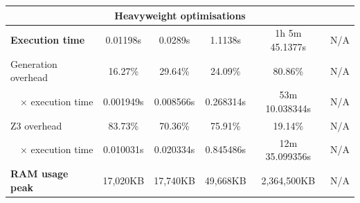 \documentclass[english,runningheads]{llncs}
\begin{document}
\begin{table}[b]
{\begin{tabular}{l||lllll}
\multicolumn{6}{c}{\textbf{Heavyweight optimisations}} \\ \hline \hline
\textbf{Execution time}                & \multicolumn{1}{c|}{0.01198s}   & \multicolumn{1}{c|}{0.0289s}   & \multicolumn{1}{c|}{1.1138s}   & \multicolumn{1}{c|}{1h 5m 45.1377s} & \multicolumn{1}{c}{\color[HTML]{888888} N/A} \\ \hline
Generation overhead                    & \multicolumn{1}{c|}{16.27\%}    & \multicolumn{1}{c|}{29.64\%}   & \multicolumn{1}{c|}{24.09\%}   & \multicolumn{1}{c|}{80.86\%}        & \multicolumn{1}{c}{\color[HTML]{888888} N/A} \\ \hline
\multicolumn{1}{r||}{× execution time} & \multicolumn{1}{c|}{0.001949s}  & \multicolumn{1}{c|}{0.008566s} & \multicolumn{1}{c|}{0.268314s} & \multicolumn{1}{c|}{53m 10.038344s} & \multicolumn{1}{c}{\color[HTML]{888888} N/A} \\ \hline
Z3 overhead                            & \multicolumn{1}{c|}{83.73\%}    & \multicolumn{1}{c|}{70.36\%}   & \multicolumn{1}{c|}{75.91\%}   & \multicolumn{1}{c|}{19.14\%}        & \multicolumn{1}{c}{\color[HTML]{888888} N/A} \\ \hline
\multicolumn{1}{r||}{× execution time} & \multicolumn{1}{c|}{0.010031s}  & \multicolumn{1}{c|}{0.020334s} & \multicolumn{1}{c|}{0.845486s} & \multicolumn{1}{c|}{12m 35.099356s} & \multicolumn{1}{c}{\color[HTML]{888888} N/A} \\ \hline
\textbf{RAM usage peak}                & \multicolumn{1}{c|}{17,020KB}   & \multicolumn{1}{c|}{17,740KB}  & \multicolumn{1}{c|}{49,668KB}  & \multicolumn{1}{c|}{2,364,500KB}    & \multicolumn{1}{c}{\color[HTML]{888888} N/A}
\end{tabular}
}
\end{table}
\end{document}
